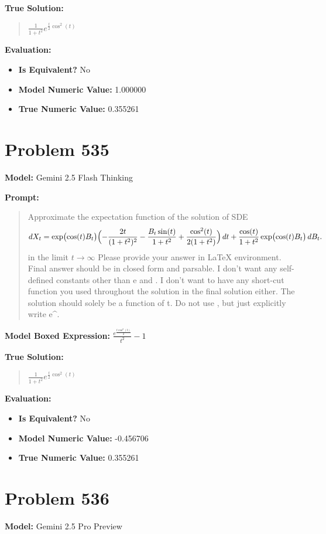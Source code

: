 \documentclass{article}
\begin{document}
\textbf{True Solution:}
\begin{quote}
$\frac{1}{1 + t^2} e^{\frac{t}{2}\cos^2(t)}$
\end{quote}

\textbf{Evaluation:}
\begin{itemize}
\item \textbf{Is Equivalent?} No
\item \textbf{Model Numeric Value:} 1.000000
\item \textbf{True Numeric Value:} 0.355261
\end{itemize}
\vspace{1cm}
\section*{Problem 535}
\textbf{Model:} Gemini 2.5 Flash Thinking

\textbf{Prompt:}
\begin{quote}
Approximate the expectation function of the solution of SDE $$dX_t=\exp\bigl(\cos(t)B_t\bigr)\Bigl(-\frac{2t}{(1+t^2)^2}-\frac{B_t\sin(t)}{1+t^2}+\frac{\cos^2(t)}{2(1+t^2)}\Bigr)\,dt+\frac{\cos(t)}{1+t^2}\exp\bigl(\cos(t)B_t\bigr)\,dB_t.$$ in the limit $t \to \infty$ Please provide your answer in LaTeX \boxed{} environment. Final answer should be in closed form and parsable. I don't want any self-defined constants other than e and \pi. I don't want to have any short-cut function you used throughout the solution in the final solution either. The solution should solely be a function of t. Do not use \exp, but just explicitly write e^.
\end{quote}
\textbf{Model Boxed Expression:} $\frac{e^{\frac{t\cos^2(t)}{2}}}{t^2}-1$

\textbf{True Solution:}
\begin{quote}
$\frac{1}{1 + t^2} e^{\frac{t}{2}\cos^2(t)}$
\end{quote}

\textbf{Evaluation:}
\begin{itemize}
\item \textbf{Is Equivalent?} No
\item \textbf{Model Numeric Value:} -0.456706
\item \textbf{True Numeric Value:} 0.355261
\end{itemize}
\vspace{1cm}
\section*{Problem 536}
\textbf{Model:} Gemini 2.5 Pro Preview
\end{document}
